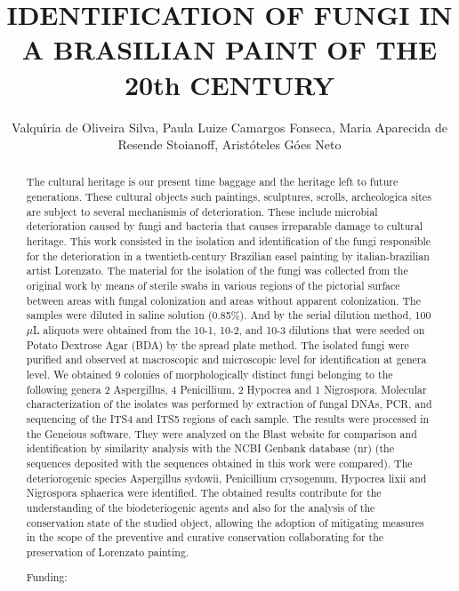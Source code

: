 \documentclass[twoside]{article}
\title{\vspace{-15mm}\fontsize{24pt}{10pt}\selectfont\textbf{ IDENTIFICATION OF FUNGI IN A BRASILIAN PAINT OF THE 20th CENTURY }} %
\author{ Valqu\'{\i}ria de Oliveira Silva, Paula Luize Camargos Fonseca, Maria  Aparecida de Resende Stoianoff, Arist\'oteles G\'oes Neto }
\affil{ Universidade Federal de Minas Gerais }
\date{}
\begin{document}
  
  
  \maketitle %
  
  
  \thispagestyle{fancy} %
  
  
  \begin{abstract}
  The cultural heritage is our present time baggage and the heritage left to future generations. These cultural objects such paintings,  sculptures,  scrolls,  archeologica sites are subject to several mechanismis of deterioration. These include microbial deterioration caused by fungi and bacteria that causes irreparable damage to cultural heritage. This work consisted in the isolation and identification of the fungi responsible for the deterioration in a twentieth-century Brazilian easel painting by italian-brazilian artist Lorenzato. The material for the isolation of the fungi was collected from the original work by means of sterile swabs in various regions of the pictorial surface between areas with fungal colonization and areas without apparent colonization. The samples were diluted in saline solution (0.85\%). And by the serial dilution method,  100$\mu$L aliquots were obtained from the  10-1,  10-2,  and 10-3 dilutions that were seeded on Potato Dextrose Agar (BDA) by the spread plate method. The isolated fungi were purified and observed at macroscopic and microscopic level for identification at genera level. We obtained 9 colonies of morphologically distinct fungi belonging to the following genera 2 Aspergillus,  4 Penicillium,  2 Hypocrea and 1 Nigrospora. Molecular characterization of the isolates was performed by extraction of fungal DNAs,  PCR,  and sequencing of the ITS4 and ITS5 regions of each sample. The results were processed in the Geneious software. They were analyzed on the Blast website for comparison and identification by similarity analysis with the NCBI Genbank database (nr) (the sequences deposited with the sequences obtained in this work were compared). The deteriorogenic species Aspergillus sydowii,  Penicillium crysogenum,  Hypocrea lixii and Nigrospora sphaerica were identified. The obtained results contribute for the understanding of the biodeteriogenic agents and also for the analysis of the conservation state of the studied object,  allowing the adoption of mitigating measures in the scope of the preventive and curative conservation collaborating for the preservation of Lorenzato painting.
  
  Funding:  \\ 
  \end{abstract}
  
\end{document}
